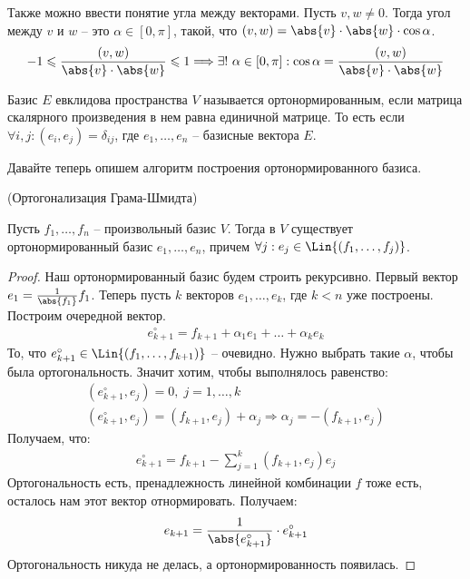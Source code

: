 Также можно ввести понятие угла между векторами. Пусть $v, w \neq 0$. Тогда угол между $v$ и $w$ -- это $\alpha \in [0, \pi]$, такой, что $(v, w) = \abs{v} \cdot \abs{w} \cdot \cos{\alpha}$. 
\begin{gather*}
    -1 \leqslant \frac{(v, w)}{\abs{v} \cdot \abs{w}} \leqslant 1
    \Longrightarrow \exists ! \ \alpha \in [0, \pi] : \cos{\alpha} = \frac{(v, w)}{\abs{v} \cdot \abs{w}}
\end{gather*}
\begin{conj}
    Базис $E$ евклидова пространства $V$ называется ортонормированным, если матрица скалярного произведения в нем равна единичной матрице. То есть если $\forall i, j: (e_i, e_j) = \delta_{ij}$, где 
    $e_1, \dots, e_n$ -- базисные вектора $E$.  
\end{conj}
Давайте теперь опишем алгоритм построения ортонормированного базиса. 
\begin{theorem-non} (Ортогонализация Грама-Шмидта)

    Пусть $f_1, \dots, f_n$ -- произвольный базис $V$. Тогда в $V$ существует ортонормированный базис $e_1, \dots, e_n$, причем $\forall j : e_j \in \Lin{(f_1, \dots, f_j)}$.  
\end{theorem-non}
\begin{proof}
    Наш ортонормированный базис будем строить рекурсивно. Первый вектор $e_1 = \frac{1}{\abs{f_1}} f_1$. Теперь пусть $k$ векторов $e_1, \dots, e_k$, где $k < n$ уже построены. Построим очередной вектор.  
    \begin{gather*}
        e_{k+1}^\circ = f_{k+1} + \alpha_1 e_1 + \dots + \alpha_k e_k
    \end{gather*} 
    То, что $e_{k+1}^\circ \in \Lin{(f_1, \dots, f_{k+1})}$ -- очевидно. Нужно выбрать такие $\alpha$, чтобы была ортогональность. Значит хотим, чтобы выполнялось равенство:
    \begin{gather*}
        (e_{k+1}^\circ, e_j) = 0, \; j=1, \dots, k \\
        (e_{k+1}^\circ, e_j) = (f_{k+1}, e_j) + \alpha_j \Longrightarrow \alpha_j = -(f_{k+1} , e_j)
    \end{gather*} 
    Получаем, что: 
    \begin{gather*}
        e_{k+1}^\circ = f_{k+1} - \sum\limits_{j=1}^k (f_{k+1}, e_j)e_j
    \end{gather*}
    Ортогональность есть, пренадлежность линейной комбинации $f$ тоже есть, осталось нам этот вектор отнормировать. Получаем: 
    \begin{gather*}
        e_{k+1} = \frac{1}{\abs{e_{k+1}^\circ}} \cdot e_{k+1}^\circ
    \end{gather*}
    Ортогональность никуда не делась, а ортонормированность появилась. 
\end{proof}
